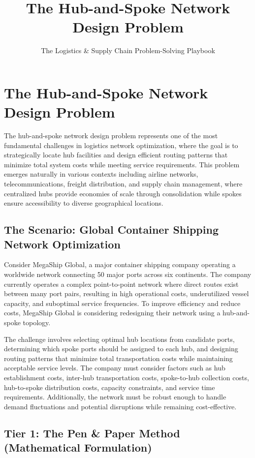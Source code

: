 \documentclass{article}
\title{The Hub-and-Spoke Network Design Problem}
\author{The Logistics \& Supply Chain Problem-Solving Playbook}
\date{}
\begin{document}
\maketitle

\section{The Hub-and-Spoke Network Design Problem}

The hub-and-spoke network design problem represents one of the most fundamental challenges in logistics network optimization, where the goal is to strategically locate hub facilities and design efficient routing patterns that minimize total system costs while meeting service requirements. This problem emerges naturally in various contexts including airline networks, telecommunications, freight distribution, and supply chain management, where centralized hubs provide economies of scale through consolidation while spokes ensure accessibility to diverse geographical locations.

\subsection{The Scenario: Global Container Shipping Network Optimization}

Consider MegaShip Global, a major container shipping company operating a worldwide network connecting 50 major ports across six continents. The company currently operates a complex point-to-point network where direct routes exist between many port pairs, resulting in high operational costs, underutilized vessel capacity, and suboptimal service frequencies. To improve efficiency and reduce costs, MegaShip Global is considering redesigning their network using a hub-and-spoke topology.

The challenge involves selecting optimal hub locations from candidate ports, determining which spoke ports should be assigned to each hub, and designing routing patterns that minimize total transportation costs while maintaining acceptable service levels. The company must consider factors such as hub establishment costs, inter-hub transportation costs, spoke-to-hub collection costs, hub-to-spoke distribution costs, capacity constraints, and service time requirements. Additionally, the network must be robust enough to handle demand fluctuations and potential disruptions while remaining cost-effective.

\subsection{Tier 1: The Pen \& Paper Method (Mathematical Formulation)}
\end{document}
